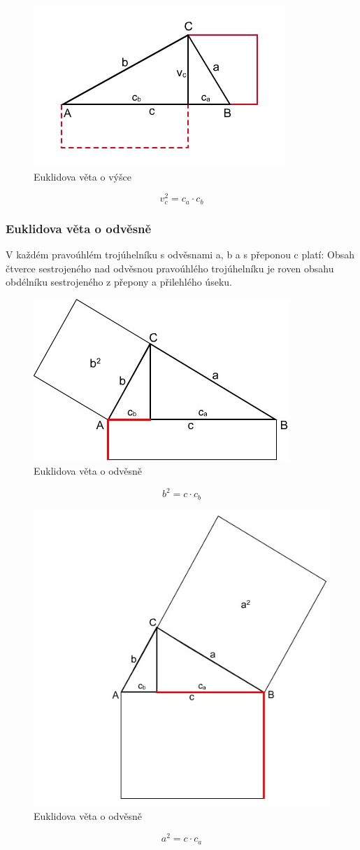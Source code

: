 \begin{figure}[H]
        \centering
        \includegraphics[width=0.5\linewidth]{img/24_euklidovy_vety.png}
        \caption{Euklidova věta o výšce} 
        \label{fig:enter-label}
    \end{figure}
$$
    v_c^2=c_a\cdot c_b
$$
\subsubsection{Euklidova věta o odvěsně}
V každém pravoúhlém trojúhelníku s odvěsnami a, b a s přeponou c platí:
Obsah čtverce sestrojeného nad odvěsnou pravoúhlého trojúhelníku je roven obsahu obdélníku sestrojeného z přepony a přilehlého úseku.
\begin{figure}[H]
        \centering
        \includegraphics[width=0.5\linewidth]{img/24_euklidovy_vety_2.png}
        \caption{Euklidova věta o odvěsně} 
        \label{fig:enter-label}
    \end{figure}

$$
    b^2=c \cdot c_b
$$

\begin{figure}[H]
        \centering
        \includegraphics[width=0.5\linewidth]{img/24_euklidovy_vety_3.png}
        \caption{Euklidova věta o odvěsně} 
        \label{fig:enter-label}
    \end{figure}

$$
    a^2=c \cdot c_a
$$